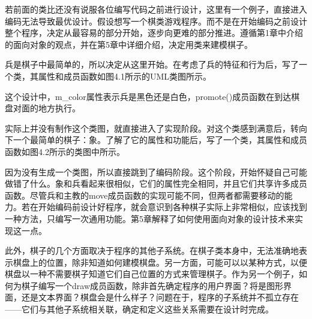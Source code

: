 若前面的类比还没有说服各位编写代码之前进行设计，这里有一个例子，直接进入编码无法导致最优设计。假设想写一个棋类游戏程序。而不是在开始编码之前设计整个程序，决定从最容易的部分开始，逐步向更难的部分推进。遵循第1章中介绍的面向对象的观点，并在第5章中详细介绍，决定用类来建模棋子。

兵是棋子中最简单的，所以决定从这里开始。在考虑了兵的特征和行为后，写了一个类，其属性和成员函数如图4.1所示的UML类图所示。


这个设计中，m\_color属性表示兵是黑色还是白色，promote()成员函数在到达棋盘对面的地方执行。

实际上并没有制作这个类图，就直接进入了实现阶段。对这个类感到满意后，转向下一个最简单的棋子：象。了解了它的属性和功能后，写了一个类，其属性和成员函数如图4.2所示的类图中所示。


因为没有生成一个类图，所以直接跳到了编码阶段。这个阶段，开始怀疑自己可能做错了什么。象和兵看起来很相似，它们的属性完全相同，并且它们共享许多成员函数。尽管兵和主教的move成员函数的实现可能不同，但两者都需要移动的能力。若在开始编码前设计好程序，就会意识到各种棋子实际上非常相似，应该找到一种方法，只编写一次通用功能。第5章解释了如何使用面向对象的设计技术来实现这一点。

此外，棋子的几个方面取决于程序的其他子系统。在棋子类本身中，无法准确地表示棋盘上的位置，除非知道如何建模棋盘。另一方面，可能可以以某种方式，以便棋盘以一种不需要棋子知道它们自己位置的方式来管理棋子。作为另一个例子，如何为棋子编写一个draw成员函数，除非首先确定程序的用户界面？将是图形界面，还是文本界面？棋盘会是什么样子？问题在于，程序的子系统并不孤立存在——它们与其他子系统相关联，确定和定义这些关系需要在设计时完成。




